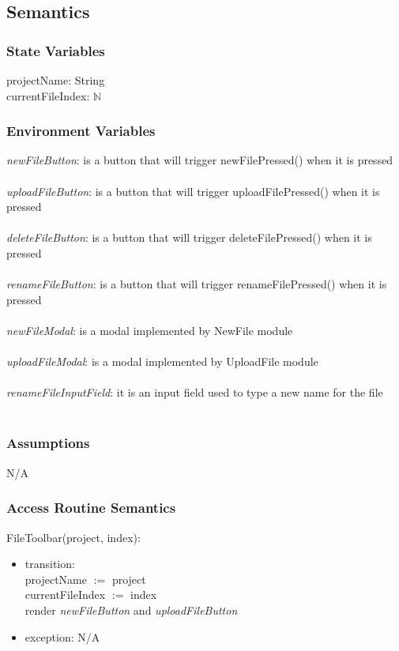 \documentclass[12pt, titlepage]{article}
\begin{document}
	\subsection{Semantics}
	
	\subsubsection{State Variables}
	
	projectName: String\\
	currentFileIndex: $\mathbb{N}$
	
	\subsubsection{Environment Variables}
	
	\textit{newFileButton}: is a button that will trigger newFilePressed() when it is pressed\\\\
	\textit{uploadFileButton}: is a button that will trigger uploadFilePressed() when it is pressed\\\\
	\textit{deleteFileButton}: is a button that will trigger deleteFilePressed() when it is pressed\\\\
	\textit{renameFileButton}: is a button that will trigger renameFilePressed() when it is pressed\\\\
	\textit{newFileModal}: is a modal implemented by NewFile module\\\\
	\textit{uploadFileModal}: is a modal implemented by UploadFile module\\\\
	\textit{renameFileInputField}: it is an input field used to type a new name for the file\\\\
	
	\subsubsection{Assumptions}
	N/A
	
	\subsubsection{Access Routine Semantics}
	
	\noindent FileToolbar(project, index):
	\begin{itemize}
		\item transition: \\
		projectName $:=$ project \\
		currentFileIndex $:=$ index \\
		render \textit{newFileButton} and \textit{uploadFileButton}
		\item exception: N/A
	\end{itemize}
	
\end{document}
